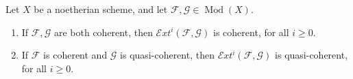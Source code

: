 Let $X$ be a noetherian scheme, and let $\mathcal{F}, \mathcal{G} \in \operatorname{Mod}(X)$.

\begin{enumerate}
\item[(a)] If $\mathcal{F}, \mathcal{G}$ are both coherent, then $\mathcal{E}xt^i(\mathcal{F}, \mathcal{G})$ is coherent, for all $i \geq 0$.
\item[(b)] If $\mathcal{F}$ is coherent and $\mathcal{G}$ is quasi-coherent, then $\mathcal{E}xt^i(\mathcal{F}, \mathcal{G})$ is quasi-coherent, for all $i \geq 0$.
\end{enumerate}
